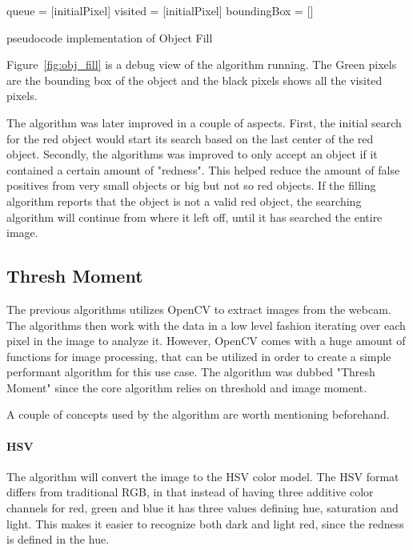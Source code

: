 \begin{algorithm}[H]
	queue = [initialPixel]\;
	visited = [initialPixel]\;
	boundingBox = []\;
 	\BlankLine
 	\caption{pseudocode implementation of Object Fill}
\end{algorithm}

Figure~\ref{fig:obj_fill} is a debug view of the algorithm running.
The Green pixels are the bounding box of the object and the black pixels shows all the visited pixels.


The algorithm was later improved in a couple of aspects.
First, the initial search for the red object would start its search based on the last center of the red object.
Secondly, the algorithms was improved to only accept an object if it contained a certain amount of "redness".
This helped reduce the amount of false positives from very small objects or big but not so red objects.
If the filling algorithm reports that the object is not a valid red object, the searching algorithm will continue from where it left off, until it has searched the entire image.

\subsection{Thresh Moment}\label{des:thresh}

The previous algorithms utilizes OpenCV to extract images from the webcam. 
The algorithms then work with the data in a low level fashion iterating over each pixel in the image to analyze it.
However, OpenCV comes with a huge amount of functions for image processing, that can be utilized in order to create a simple performant algorithm for this use case. 
The algorithm was dubbed "Thresh Moment" since the core algorithm relies on threshold and image moment.

A couple of concepts used by the algorithm are worth mentioning beforehand.

\paragraph{HSV}
The algorithm will convert the image to the HSV color model.
The HSV format differs from traditional RGB, in that instead of having three additive color channels for red, green and blue it has three values defining hue, saturation and light.
This makes it easier to recognize both dark and light red, since the redness is defined in the hue.

